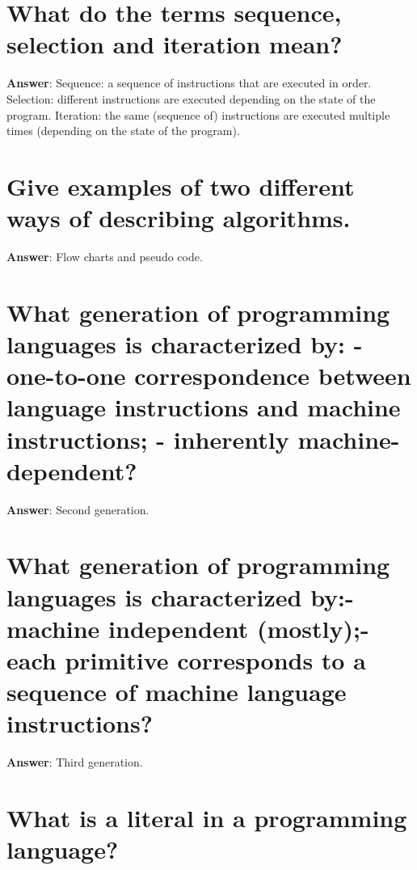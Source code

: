 \documentclass[a4paper,11pt,oneside]{book}
\begin{document}
\begin{sloppypar}
\section{What do the terms sequence, selection and iteration mean?}

\label{q:207:sa:en:True}

\textbf{Answer}: Sequence: a sequence of instructions that are executed in order. Selection: different instructions are executed depending on the state of the program. Iteration: the same (sequence of) instructions are executed multiple times (depending on the state of the program).



\section{Give examples of two different ways of describing algorithms.}

\label{q:208:sa:en:True}

\textbf{Answer}: Flow charts and pseudo code.



\section{What generation of programming languages is characterized by: - one-to-one correspondence between language instructions and machine instructions; - inherently machine-dependent?}

\label{q:209:sa:en:True}

\textbf{Answer}: Second generation.



\section{What generation of programming languages is characterized by:- machine independent (mostly);- each primitive corresponds to a sequence of machine language instructions?}

\label{q:210:sa:en:True}

\textbf{Answer}: Third generation.



\section{What is a literal in a programming language?}

\label{q:211:sa:en:True}


\end{sloppypar}
\end{document}

